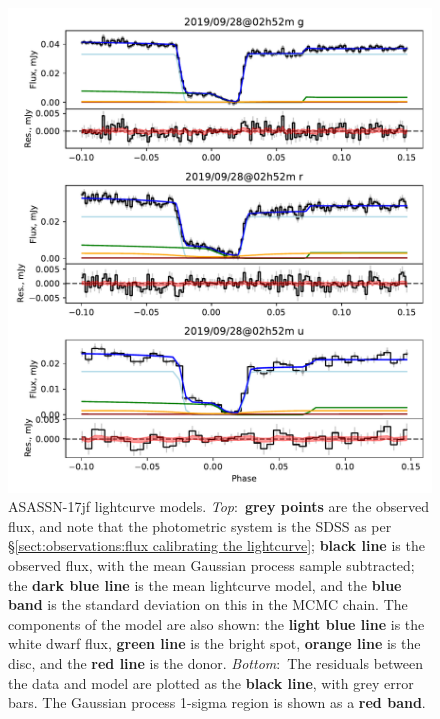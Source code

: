\begin{figure}
    \centering
    \includegraphics[width=\textwidth]{figures/results/three_cvs_with_weird_colours/ASASSN-17jf/ASASSN-17jf_1.pdf}
    \caption{ASASSN-17jf lightcurve models. {\it Top}:~{\bf grey points} are the observed flux, and note that the photometric system is the SDSS as per \S\ref{sect:observations:flux calibrating the lightcurve}; {\bf black line} is the observed flux, with the mean Gaussian process sample subtracted; the {\bf dark blue line} is the mean lightcurve model, and the {\bf blue band} is the standard deviation on this in the MCMC chain. The components of the model are also shown: the {\bf light blue line} is the white dwarf flux, {\bf green line} is the bright spot, {\bf orange line} is the disc, and the {\bf red line} is the donor. {\it Bottom}:~The residuals between the data and model are plotted as the {\bf black line}, with grey error bars. The Gaussian process 1-sigma region is shown as a {\bf red band}.}
    \label{fig:ASASSN-17jf all lightcurves}
\end{figure}
